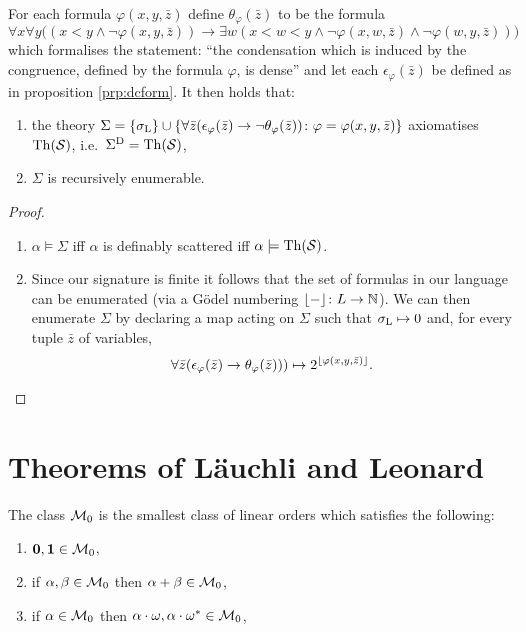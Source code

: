 \begin{prp}\label{prp:rescat}
	For each formula $\varphi(x,y,\bar{z})$ define $\theta_\varphi(\bar{z})$ to be the formula
	\begin{equation}
		\forall x\forall y\big((x<y\wedge\neg\varphi(x,y,\bar{z}))\rightarrow\exists w(x<w<y\wedge\neg\varphi(x,w,\bar{z})\wedge\neg\varphi(w,y,\bar{z}))\big)
	\end{equation}
	which formalises the statement: ``the condensation which is induced by the congruence, defined by the formula $\varphi$, is dense'' and let each $\epsilon_\varphi(\bar{z})$ be defined as in proposition \ref{prp:dcform}.  It then holds that:
	\begin{enumerate}
		\item the theory $\Sigma=\left\lbrace \sigma_{\mathrm{L}}\right\rbrace\cup\left\lbrace \forall\bar{z}(\epsilon_\varphi(\bar{z})\rightarrow\neg\theta_\varphi(\bar{z}))\colon \varphi=\varphi(x,y,\bar{z}) \right\rbrace$ axiomatises $\operatorname{Th}(\mathcal{S})$, i.e.\ ${\Sigma}^\mathrm{D}=\operatorname{Th}(\mathcal{S})$,

		\item $\Sigma$ is recursively enumerable.
	\end{enumerate}
	\begin{proof}
		\begin{enumerate}[nosep]
			\item	$\alpha\models\Sigma$ iff $\alpha$ is definably scattered iff $\alpha\models\operatorname{Th}(\mathcal{S})$.
			\item	Since our signature is finite it follows that the set of formulas in our language can be enumerated (via a G\"odel numbering $\lfloor -\rfloor\colon L\to\mathbb{N}$).  We can then enumerate $\Sigma$ by declaring a map acting on $\Sigma$ such that $\sigma_{\mathrm{L}}\mapsto 0$ and, for every tuple $\bar{z}$ of variables,
			\begin{equation}
				\forall \bar{z}(\epsilon_\varphi(\bar{z})\rightarrow\theta_\varphi(\bar{z})))\mapsto 2^{\lfloor \varphi(x,y,\bar{z})\rfloor}.
			\end{equation}
		\end{enumerate}
	\end{proof}
\end{prp}


\section{Theorems of L\"auchli and Leonard}

\begin{dfn}
	The class $\mathcal{M}_0$ is the smallest class of linear orders which satisfies the following:
	\begin{enumerate}
		\item	$\mathbf{0},\mathbf{1}\in\mathcal{M}_0$,
		\item	if $\alpha,\beta\in\mathcal{M}_0$ then $\alpha+\beta\in\mathcal{M}_0$,
		\item	if $\alpha\in\mathcal{M}_0$ then $\alpha\cdot\omega,\alpha\cdot{\omega}^\ast\in\mathcal{M}_0$,
	\end{enumerate}
\end{dfn}

